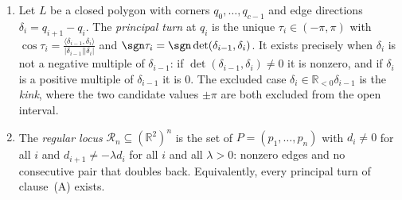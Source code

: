 \begin{definition}\label{CV:def:regular}\leanok
\begin{enumerate}
\item[(A)] Let $L$ be a closed polygon with corners $q_0,\dots,q_{c-1}$ and edge directions
$\delta_i=q_{i+1}-q_i$. The \emph{principal turn} at $q_i$ is the unique
$\tau_i\in(-\pi,\pi)$ with
$\cos\tau_i=\frac{\langle\delta_{i-1},\delta_i\rangle}{|\delta_{i-1}||\delta_i|}$
and $\sgn\tau_i=\sgn\det(\delta_{i-1},\delta_i)$. It exists precisely when
$\delta_i$ is not a negative multiple of $\delta_{i-1}$: if
$\det(\delta_{i-1},\delta_i)\neq0$ it is nonzero, and if $\delta_i$ is a
positive multiple of $\delta_{i-1}$ it is $0$. The excluded case
$\delta_i\in\mathbb R_{<0}\delta_{i-1}$ is the \emph{kink}, where the two
candidate values $\pm\pi$ are both excluded from the open interval.
\item[(B)] The \emph{regular locus} $\mathcal R_n\subseteq(\mathbb R^2)^n$ is the set of
$P=(p_1,\dots,p_n)$ with $d_i\neq0$ for all $i$ and $d_{i+1}\neq-\lambda d_i$
for all $i$ and all $\lambda>0$: nonzero edges and no consecutive pair that
doubles back. Equivalently, every principal turn of
clause~(A) exists.
\end{enumerate}
\end{definition}

